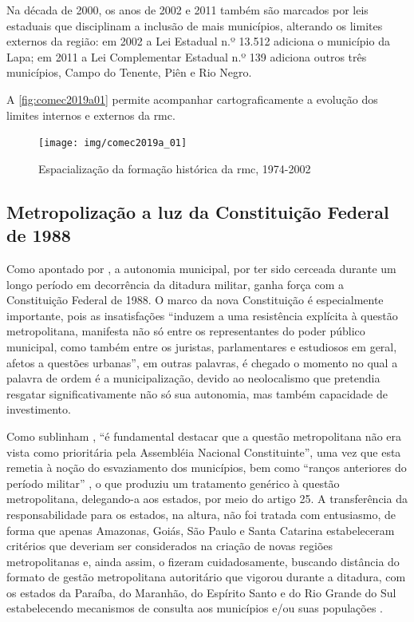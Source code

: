 	Na década de 2000, os anos de 2002 e 2011 também são marcados por leis estaduais que disciplinam a inclusão de mais municípios, alterando os limites externos da região: em 2002 a Lei Estadual n.º 13.512 adiciona o município da Lapa; em 2011 a Lei Complementar Estadual n.º 139 adiciona outros três municípios, Campo do Tenente, Piên e Rio Negro.
	
	A \autoref{fig:comec2019a01} permite acompanhar cartograficamente a evolução dos limites internos e externos da \glsdesc{rmc}.
	
	\begin{figure}
		\centering
		\caption{Espacialização da formação histórica da \glsdesc{rmc}, 1974-2002}
		\label{fig:comec2019a01}
		\texttt{[image: img/comec2019a\_01]}
	\end{figure}
	
	\subsection{Metropolização a luz da Constituição Federal de 1988}
	
	Como apontado por , a autonomia municipal, por ter sido cerceada durante um longo período em decorrência da ditadura militar, ganha força com a Constituição Federal de 1988. O marco da nova Constituição é especialmente importante, pois as insatisfações ``induzem a uma resistência explícita à questão metropolitana, manifesta não só entre os representantes do poder público municipal, como também entre os juristas, parlamentares e estudiosos em geral, afetos a questões urbanas'', em outras palavras, é chegado o momento no qual a palavra de ordem é a municipalização, devido ao neolocalismo que pretendia resgatar significativamente não só sua autonomia, mas também capacidade de investimento.
	
	Como sublinham , ``é fundamental destacar que a questão metropolitana não era vista como prioritária pela Assembléia Nacional Constituinte'', uma vez que esta remetia à noção do esvaziamento dos municípios, bem como ``ranços anteriores do período militar'' , o que produziu um tratamento genérico à questão metropolitana, delegando-a aos estados, por meio do artigo 25. A transferência da responsabilidade para os estados, na altura, não foi tratada com entusiasmo, de forma que apenas Amazonas, Goiás, São Paulo e Santa Catarina estabeleceram critérios que deveriam ser considerados na criação de novas regiões metropolitanas e, ainda assim, o fizeram cuidadosamente, buscando distância do formato de gestão metropolitana autoritário que vigorou durante a ditadura, com os estados da Paraíba, do Maranhão, do Espírito Santo e do Rio Grande do Sul estabelecendo mecanismos de consulta aos municípios e/ou suas populações \cite[p. 102]{guia2015a}.
	
